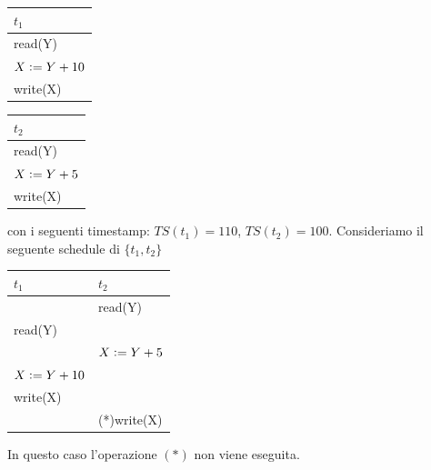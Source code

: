 \begin{multicols}{2}
 \begin{tabular}{|l|}
  \hline
  $t_1$\\
  \hline
  read(Y)\\
  $X\vcentcolon=Y+10$\\
  write(X)\\
  \hline
 \end{tabular}

  \begin{tabular}{|l|}
  \hline
  $t_2$\\
  \hline
  read(Y)\\
  $X\vcentcolon=Y+5$\\
  write(X)\\
  \hline
 \end{tabular} 
\end{multicols}
con i seguenti timestamp: $TS(t_1)= 110$, $TS(t_2)=100$. Consideriamo il seguente schedule di $\{t_1, t_2\}$
\begin{center}
 \begin{tabular}{|l|l|}
 \hline
  $t_1$ & $t_2$\\
 \hline
 &read(Y)\\
 read(Y)&\\
 &$X\vcentcolon=Y+5$\\
 $X\vcentcolon =Y+10$&\\
  write(X)&\\
  &(*)write(X)\\
  \hline
 \end{tabular}
\end{center}

In questo caso l'operazione $(*)$ non viene eseguita.
